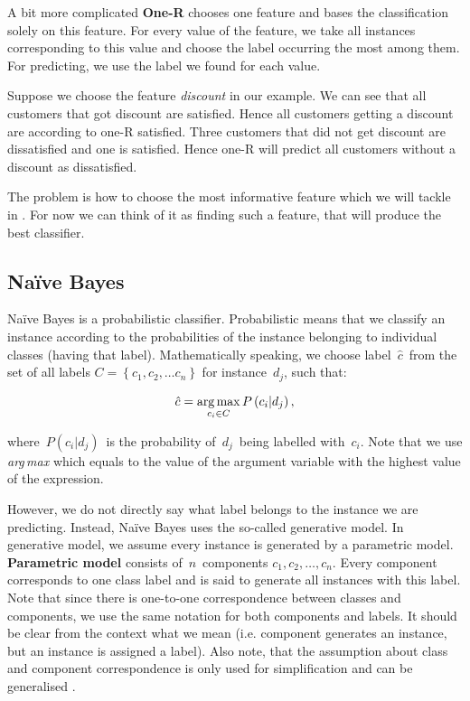 A bit more complicated {\bf One-R} chooses one feature and bases the classification solely on this feature.
For every value of the feature, we take all instances corresponding to this value and choose the label occurring the most among them.
For predicting, we use the label we found for each value.

Suppose we choose the feature {\it discount} in our example.
We can see that all customers that got discount are satisfied.
Hence all customers getting a discount are according to one-R satisfied.
Three customers that did not get discount are dissatisfied and one is satisfied.
Hence one-R will predict all customers without a discount as dissatisfied.

The problem is how to choose the most informative feature which we will tackle in .
For now we can think of it as finding such a feature, that will produce the best classifier.

\subsection{Na\"{i}ve Bayes}

Na\"{i}ve Bayes is a probabilistic classifier.
Probabilistic means that we classify an instance according to the probabilities of the instance belonging to individual classes (having that label).
Mathematically speaking, we choose label~$\hat{c}$~from the set of all labels $C=\left\{c_1,c_2,\dots c_n\right\}$ for instance~$d_j$, such that:

\begin{equation}
	\label{eq:argmax}
	\hat{c} = \operatorname*{arg\,max}_{c_i \in C} P\left(c_i  | d_j \right),
\end{equation}

where~$P\left(c_i | d_j\right)$~is the probability of~$d_j$~being labelled with~$c_i$.
Note that we use \textit{arg\,max} which equals to the value of the argument variable
with the highest value of the expression.

However, we do not directly say what label belongs to the instance we are predicting.
Instead, Na\"{i}ve Bayes uses the so-called generative model.
In generative model, we assume every instance is generated by a parametric model.
\textbf{Parametric model} consists of~$n$~components $c_1, c_2,\ldots, c_n$.
Every component corresponds to one class label
and is said to generate all instances with this label.
Note that since there is one-to-one correspondence between classes and components,
we use the same notation for both components and labels.
It should be clear from the context what we mean (i.e. component generates an instance,
but an instance is assigned a label).
Also note, that the assumption about class and component correspondence is only used for simplification and can be generalised .

